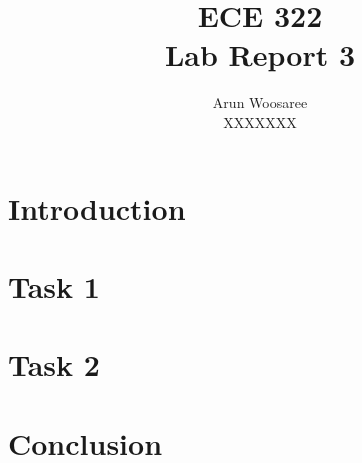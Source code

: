 \documentclass[letterpaper]{article}
\title{ECE 322 \\
Lab Report 3}
\author{Arun Woosaree\\
XXXXXXX}
\begin{document}
\maketitle

\section{Introduction}


\section{Task 1}



\section{Task 2}


\section{Conclusion}



\vfill
\appendix

%



%
%
\end{document}

